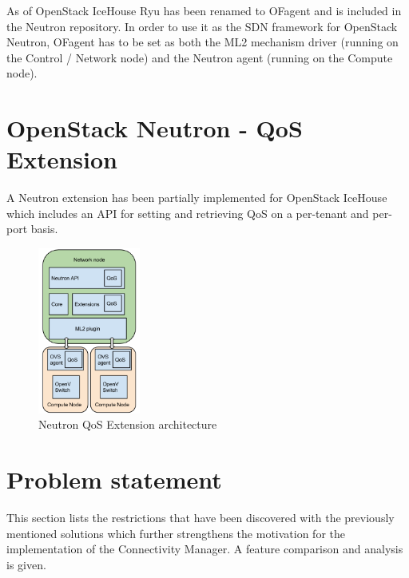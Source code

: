 As of OpenStack IceHouse Ryu has been renamed to OFagent and is included in the Neutron repository. In order to use it as the SDN framework for OpenStack Neutron, OFagent has to be set as both the ML2 mechanism driver (running on the Control / Network node) and the Neutron agent (running on the Compute node). 


\section{OpenStack Neutron - QoS Extension}

A Neutron extension has been partially implemented for OpenStack IceHouse which includes an API for setting and retrieving QoS on a per-tenant and per-port basis.


\begin{figure}[H]
\centering
\includegraphics[width=0.3\textwidth]{images/sota/neutron_qos_extension.png}
\caption{Neutron QoS Extension architecture}
\end{figure}



\section{Problem statement}

This section lists the restrictions that have been discovered with the previously mentioned solutions which further strengthens the motivation for the implementation of the Connectivity Manager. A feature comparison and analysis is given.

